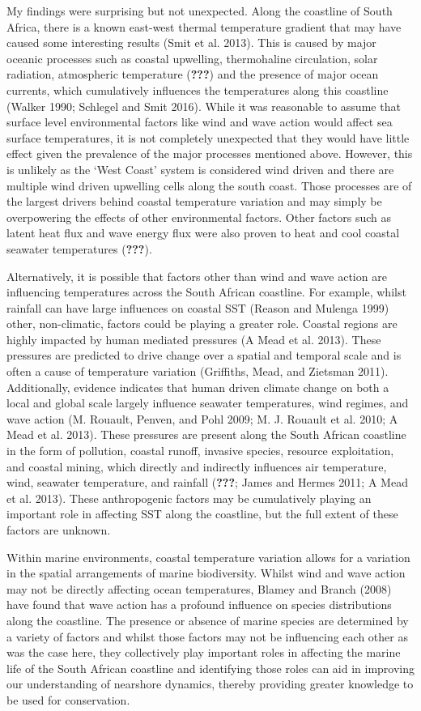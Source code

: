 \documentclass[12pt,A4paper,]{article}
\begin{document}
My findings were surprising but not unexpected. Along the coastline of
South Africa, there is a known east-west thermal temperature gradient
that may have caused some interesting results (Smit et al. 2013). This
is caused by major oceanic processes such as coastal upwelling,
thermohaline circulation, solar radiation, atmospheric temperature
({\textbf{???}}) and the presence of major ocean currents, which
cumulatively influences the temperatures along this coastline (Walker
1990; Schlegel and Smit 2016). While it was reasonable to assume that
surface level environmental factors like wind and wave action would
affect sea surface temperatures, it is not completely unexpected that
they would have little effect given the prevalence of the major
processes mentioned above. However, this is unlikely as the `West Coast'
system is considered wind driven and there are multiple wind driven
upwelling cells along the south coast. Those processes are of the
largest drivers behind coastal temperature variation and may simply be
overpowering the effects of other environmental factors. Other factors
such as latent heat flux and wave energy flux were also proven to heat
and cool coastal seawater temperatures ({\textbf{???}}).

Alternatively, it is possible that factors other than wind and wave
action are influencing temperatures across the South African coastline.
For example, whilst rainfall can have large influences on coastal SST
(Reason and Mulenga 1999) other, non-climatic, factors could be playing
a greater role. Coastal regions are highly impacted by human mediated
pressures (A Mead et al. 2013). These pressures are predicted to drive
change over a spatial and temporal scale and is often a cause of
temperature variation (Griffiths, Mead, and Zietsman 2011).
Additionally, evidence indicates that human driven climate change on
both a local and global scale largely influence seawater temperatures,
wind regimes, and wave action (M. Rouault, Penven, and Pohl 2009; M. J.
Rouault et al. 2010; A Mead et al. 2013). These pressures are present
along the South African coastline in the form of pollution, coastal
runoff, invasive species, resource exploitation, and coastal mining,
which directly and indirectly influences air temperature, wind, seawater
temperature, and rainfall ({\textbf{???}}; James and Hermes 2011; A Mead
et al. 2013). These anthropogenic factors may be cumulatively playing an
important role in affecting SST along the coastline, but the full extent
of these factors are unknown.

Within marine environments, coastal temperature variation allows for a
variation in the spatial arrangements of marine biodiversity. Whilst
wind and wave action may not be directly affecting ocean temperatures,
Blamey and Branch (2008) have found that wave action has a profound
influence on species distributions along the coastline. The presence or
absence of marine species are determined by a variety of factors and
whilst those factors may not be influencing each other as was the case
here, they collectively play important roles in affecting the marine
life of the South African coastline and identifying those roles can aid
in improving our understanding of nearshore dynamics, thereby providing
greater knowledge to be used for conservation.
\end{document}
